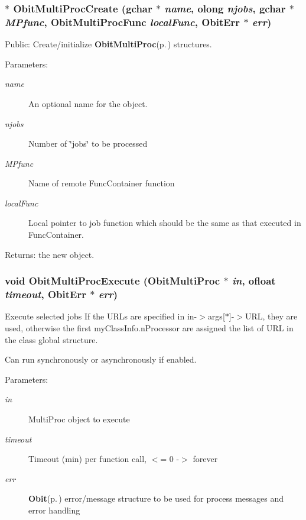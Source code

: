 \subsubsection{$\ast$ Obit\-Multi\-Proc\-Create (gchar $\ast$ {\em name}, {\bf olong} {\em njobs}, gchar $\ast$ {\em MPfunc}, {\bf Obit\-Multi\-Proc\-Func} {\em local\-Func}, {\bf Obit\-Err} $\ast$ {\em err})}\label{ObitMultiProc_8h_a7}


Public: Create/initialize {\bf Obit\-Multi\-Proc}{\rm (p.\,\pageref{structObitMultiProc})} structures. 

\begin{Desc}
\item[Parameters:]
\begin{description}
\item[{\em name}]An optional name for the object. \item[{\em njobs}]Number of \char`\"{}jobs\char`\"{} to be processed \item[{\em MPfunc}]Name of remote Func\-Container function \item[{\em local\-Func}]Local pointer to job function which should be the same as that executed in Func\-Container. \end{description}
\end{Desc}
\begin{Desc}
\item[Returns:]the new object. \end{Desc}
\subsubsection{\setlength{\rightskip}{0pt plus 5cm}void Obit\-Multi\-Proc\-Execute ({\bf Obit\-Multi\-Proc} $\ast$ {\em in}, {\bf ofloat} {\em timeout}, {\bf Obit\-Err} $\ast$ {\em err})}\label{ObitMultiProc_8h_a12}


Execute selected jobs If the URLs are specified in in-$>$args[$\ast$]-$>$URL, they are used, otherwise the first my\-Class\-Info.n\-Processor are assigned the list of URL in the class global structure. 

Can run synchronously or asynchronously if enabled. \begin{Desc}
\item[Parameters:]
\begin{description}
\item[{\em in}]Multi\-Proc object to execute \item[{\em timeout}]Timeout (min) per function call, $<$= 0 -$>$ forever \item[{\em err}]{\bf Obit}{\rm (p.\,\pageref{structObit})} error/message structure to be used for process messages and error handling \end{description}
\end{Desc}
